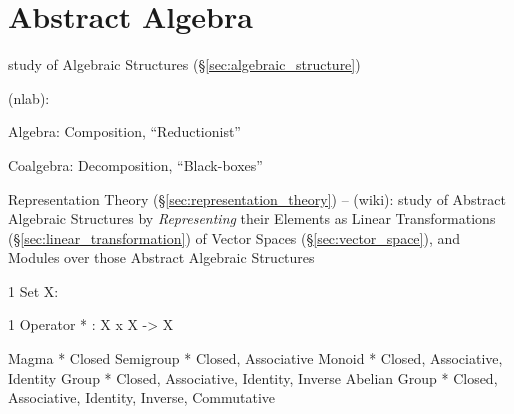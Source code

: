\part{Abstract Algebra}\label{part:abstract_algebra}

study of Algebraic Structures (\S\ref{sec:algebraic_structure})

(nlab):


Algebra: Composition, ``Reductionist''

Coalgebra: Decomposition, ``Black-boxes''

\fist Representation Theory (\S\ref{sec:representation_theory}) -- (wiki): study
of Abstract Algebraic Structures by \emph{Representing} their Elements as Linear
Transformations (\S\ref{sec:linear_transformation}) of Vector Spaces
(\S\ref{sec:vector_space}), and Modules over those Abstract Algebraic Structures

\iffalse

1 Set X:

  1 Operator
  * : X x X -> X

    Magma         * Closed
    Semigroup     * Closed, Associative
    Monoid        * Closed, Associative, Identity
    Group         * Closed, Associative, Identity, Inverse
    Abelian Group * Closed, Associative, Identity, Inverse, Commutative

